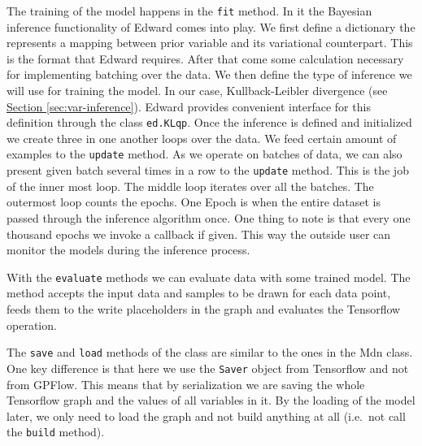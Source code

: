 \documentclass[12pt,a4paper,twoside]{scrartcl}
\numberwithin{equation}{section}
\newcommand{\refsec}[1]{\hyperref[#1]{Section \ref*{#1}}}
\begin{document}
The training of the model happens in the \texttt{fit} method. In it the Bayesian inference functionality of Edward comes into play. We first define a dictionary the represents a mapping between prior variable and its variational counterpart. This is the format that Edward requires. After that come some calculation necessary for implementing batching over the data. We then define the type of inference we will use for training the model. In our case, Kullback-Leibler divergence (see \refsec{sec:var-inference}). Edward provides convenient interface for this definition through the class \texttt{ed.KLqp}. Once the inference is defined and initialized we create three in one another loops over the data. We feed certain amount of examples to the \texttt{update} method. As we operate on batches of data, we can also present given batch several times in a row to the \texttt{update} method. This is the job of the inner most loop. The middle loop iterates over all the batches. The outermost loop counts the epochs. One Epoch is when the entire dataset is passed through the inference algorithm once. One thing to note is that every one thousand epochs we invoke a callback if given. This way the outside user can monitor the models during the inference process.

With the \texttt{evaluate} methods we can evaluate data with some trained model. The method accepts the input data and samples to be drawn for each data point, feeds them to the write placeholders in the graph and evaluates the Tensorflow operation.

The \texttt{save} and \texttt{load} methods of the class are similar to the ones in the Mdn class. One key difference is that here we use the \texttt{Saver} object from Tensorflow and not from GPFlow. This means that by serialization we are saving the whole Tensorflow graph and the values of all variables in it. By the loading of the model later, we only need to load the graph and not build anything at all (i.e.\ not call the \texttt{build} method). 
\end{document}
